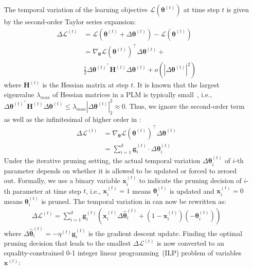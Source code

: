 The temporal variation of the learning objective $\mathcal{L}(\bm{\theta}^{(t)})$ at time step $t$ is given by the second-order Taylor series expansion:
\begin{align}
	\Delta\mathcal{L}^{(t)}&=\mathcal{L}(\bm{\theta}^{(t)}+\Delta \bm{\theta}^{(t)})-\mathcal{L}(\bm{\theta}^{(t)}) \\ \nonumber
	&= \nabla_{\bm{\theta}}\mathcal{L}(\bm{\theta}^{(t)})^{\top}\Delta \bm{\theta}^{(t)}+ \\
	& \frac{1}{2}\Delta \bm{\theta}^{(t)^{\top}}\bm{H}^{(t)}\Delta \bm{\theta}^{(t)}+o(|\Delta\bm{\theta}^{(t)}|^2)
	\label{eq:7}
\end{align}
where $\bm{H}^{(t)}$ is the Hessian matrix at step $t$. 
It is known that the largest eigenvalue $\lambda_{max}$ of Hessian matrices in 
a PLM is typically small~\cite{eigen}, i.e., $\Delta \bm{\theta}^{(t)^{\top}}\bm{H}^{(t)}\Delta \bm{\theta}^{(t)}\leq\lambda_{max}|\Delta \bm{\theta}^{(t)}|_2^2\approx 0$. Thus, we ignore the second-order term as well as the infinitesimal of higher order in :
\begin{align} \nonumber
	\Delta\mathcal{L}^{(t)}&=\nabla_{\bm{\theta}}\mathcal{L}(\bm{\theta}^{(t)})^{\top}\Delta \bm{\theta}^{(t)} \\
	&=\sum_{i=1}^{d}\bm{g}_i^{(t)}\cdot \Delta \bm{\theta}^{(t)} _i
	\label{eq:8}
\end{align}
Under the iterative pruning setting, the actual temporal variation $\Delta\bm{\theta}^{(t)}_i$ of $i$-th parameter depends on whether it is allowed to be updated or forced to zeroed out. Formally, we use a binary variable $\bm{x}_i^{(t)}$ to indicate the pruning decision of $i$-th parameter at time step $t$, i.e., $\bm{x}_i^{(t)}=1$ means $\bm{\theta}^{(t)}_i$ is updated and $\bm{x}_i^{(t)}=0$ means $\bm{\theta}^{(t)}_i$  is pruned. 
The temporal variation in  can now be rewritten as:
\begin{align}
	\Delta\mathcal{L}^{(t)}=\sum_{i=1}^{d}\bm{g}_i^{(t)}(\bm{x}_i^{(t)}\Delta\hat{\bm{\theta}}_i^{(t)}+(1-\bm{x}_i^{(t)})(-\bm{\theta}_i^{(t)}))
\end{align}
where $\Delta\hat{\bm{\theta}}_i^{(t)}=-\eta^{(t)}\bm{g}_i^{(t)}$ is the gradient descent update.  Finding the optimal pruning decision that leads to the smallest $\Delta\mathcal{L}^{(t)}$ is now converted to an equality-constrained 0-1 integer linear programming~(ILP) problem of variables $\bm{x}^{(t)}$:
